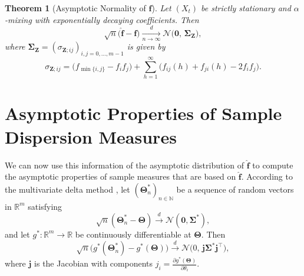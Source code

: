 ﻿\documentclass[12pt,a4paper]{scrreprt}
\newtheorem{theorem}{Theorem}[chapter]
\theoremstyle{definition}
\begin{document}
\begin{theorem}[Asymptotic Normality of $\hat{\boldsymbol{f}}$]\label{thm:clt_fhat}
Let $(X_t)$ be strictly stationary and $\alpha$-mixing with exponentially decaying
coefficients. Then
\[
\sqrt{n}\bigl(\hat{\boldsymbol{f}} - \boldsymbol{f}\bigr)
\xrightarrow[n\to\infty]{d}
\mathcal{N}\bigl(\boldsymbol{0},\, \boldsymbol{\Sigma}_{\boldsymbol{Z}}\bigr),
\]
where $\boldsymbol{\Sigma}_{\boldsymbol{Z}} = (\sigma_{\boldsymbol{Z};ij})_{i,j=0,\ldots,m-1}$ is given by
\begin{equation*}\label{eq:sigma_Z}
\sigma_{\boldsymbol{Z};ij} = \bigl(f_{\min\{i,j\}} - f_if_j\bigr)
+ \sum_{h=1}^{\infty}\bigl(f_{ij}(h) + f_{ji}(h) - 2f_if_j\bigr).
\end{equation*}
\end{theorem}
\section{Asymptotic Properties of Sample Dispersion Measures}
We can now use this information of the asymptotic distribution of $\hat{\boldsymbol{f}}$ to compute the asymptotic properties of sample measures that are based on $\hat{\boldsymbol{f}}$. 
According to the multivariate delta method \citep[Chapter~3]{VanderVaart1998}, 
let $(\boldsymbol{\Theta}^*_n)_{n \in \mathbb{N}}$ be a sequence of random vectors 
in $\mathbb{R}^m$ satisfying
\[
    \sqrt{n}(\boldsymbol{\Theta}^*_n - \boldsymbol{\Theta}) 
    \xrightarrow{d} \mathcal{N}(\boldsymbol{0}, \boldsymbol{\Sigma}^*),
\]
and let $g^*\colon \mathbb{R}^m \to \mathbb{R}$ be continuously differentiable 
at $\boldsymbol{\Theta}$. Then
\[
    \sqrt{n}\bigl(g^*(\boldsymbol{\Theta}^*_n) - g^*(\boldsymbol{\Theta})\bigr)
    \xrightarrow{d} \mathcal{N}\bigl(0,\, \boldsymbol{j}\boldsymbol{\Sigma}^*
    \boldsymbol{j}^\top\bigr),
\]
where $\boldsymbol{j}$ is the Jacobian with components 
$j_i = \frac{\partial g^*(\boldsymbol{\Theta})}{\partial \theta_i}$. \\
\end{document}

